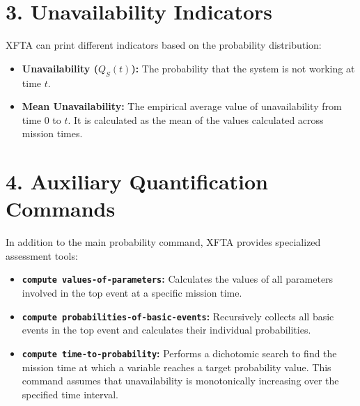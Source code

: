 \section*{3. Unavailability Indicators}
XFTA can print different indicators based on the probability distribution:
\begin{itemize}
    \item \textbf{Unavailability ($Q_S(t)$):} The probability that the system is not working at time $t$.
    \item \textbf{Mean Unavailability:} The empirical average value of unavailability from time 0 to $t$. It is calculated as the mean of the values calculated across mission times.
\end{itemize}

\section*{4. Auxiliary Quantification Commands}
In addition to the main probability command, XFTA provides specialized assessment tools:
\begin{itemize}
    \item \textbf{\texttt{compute values-of-parameters}:} Calculates the values of all parameters involved in the top event at a specific mission time.
    \item \textbf{\texttt{compute probabilities-of-basic-events}:} Recursively collects all basic events in the top event and calculates their individual probabilities.
    \item \textbf{\texttt{compute time-to-probability}:} Performs a dichotomic search to find the mission time at which a variable reaches a target probability value. This command assumes that unavailability is monotonically increasing over the specified time interval.
\end{itemize}

